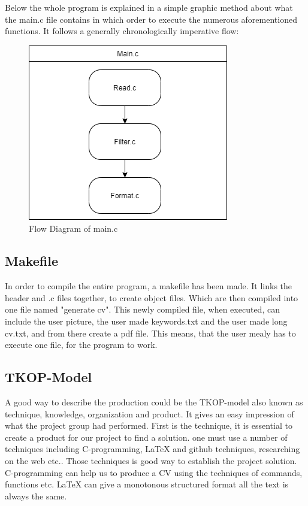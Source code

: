 Below the whole program is explained in a simple graphic method about what the main.c file contains 
in which order to execute the numerous aforementioned functions.
It follows a generally chronologically imperative flow:
\begin{figure}[H]
  \centering
  \includegraphics[scale = 0.6]{figures/main.png}
  \caption{Flow Diagram of main.c}
\end{figure}
\subsection{Makefile}
In order to compile the entire program, a makefile has been made. It links the header and .c files together, to create object files. Which are then compiled into one file named "generate cv".
This newly compiled file, when executed, can include the user picture, the user made keywords.txt and the user made long cv.txt, and from there create a pdf file.
This means, that the user mealy has to execute one file, for the program to work.

\subsection{TKOP-Model}
A good way to describe the production could be the TKOP-model also known as technique, knowledge, organization and product.
It gives an easy impression of what the project group had performed.
First is the technique, it is essential to create a product for our project to find a solution. 
one must use a number of techniques including C-programming, LaTeX and github techniques, researching on the web etc..
Those techniques is good way to establish the project solution. C-programming can help us to produce a CV using the techniques
of commands, functions etc. LaTeX can give a monotonous structured format all the text is always the same. \\

